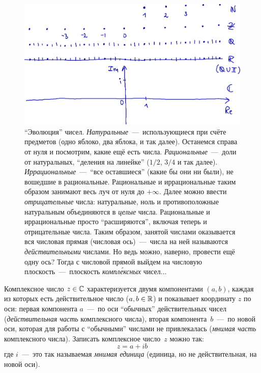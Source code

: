\documentclass[a4paper,12pt]{article}
\begin{document}
  \begin{figure}[ht]
    \centering
    \includegraphics[width=0.8\linewidth]{images/numbers-and-beyond}
    
    \caption{
      ``Эволюция'' чисел.
      \emph{Натуральные}~---~использующиеся при счёте предметов (одно яблоко, два яблока, и так далее).
      Останемся справа от нуля и посмотрим, какие ещё есть числа.
      \emph{Рациональные}~---~доли от натуральных, ``деления на линейке'' ($1/2$, $3/4$ и так далее).
      \emph{Иррациональные}~---~``все оставшиеся'' (какие бы они ни были), не вошедшие в рациональные.
      Рациональные и иррациональные таким образом занимают весь луч от нуля до $+\infty$.
      Далее можно ввести \emph{отрицательные} числа: натуральные, ноль и противоположные натуральным объединяются в \emph{целые} числа.
      Рациональные и иррациональные просто ``расширяются'', включая теперь и отрицательные числа.
      Таким образом, занятой числами оказывается вся числовая прямая (числовая ось)~---~числа на ней называются \emph{действительными} числами.
      Но ведь можно, наверно, провести ещё одну ось?
      Тогда с числовой прямой выйдем на числовую плоскость~---~плоскость \emph{компл\'{е}ксных} чисел...
    }
    \label{fig:numbers-and-beyond}
  \end{figure}

  Комплексное число $z \hm\in \CC$ характеризуется двумя компонентами $(a, b)$, каждая из которых есть действительное число ($a, b \in \operatorname{\mathbb R}$) и показывает координату $z$ по оси: первая компонента $a$~---~по оси ``обычных'' действительных чисел (\emph{действительная часть} комплексного числа), вторая компонента~$b$~---~по новой оси, которая для работы с ``обычными'' числами не привлекалась (\emph{мнимая часть} комплексного числа).
  Записать комплексное число~$z$ можно так:
  \[
    z = a + i b
  \]
  где $i$~---~это так называемая \emph{мнимая единица} (единица, но не действительная, на новой оси).
\end{document}
